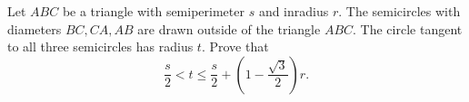 Let $ABC$ be a triangle with semiperimeter $s$ and inradius $r$. The semicircles with diameters $BC, CA, AB$ are drawn outside of the triangle $ABC$. The circle tangent to all three semicircles has radius $t$. Prove that
\[
\frac{s}{2} < t \leq \frac{s}{2} + \left(1 - \frac{\sqrt{3}}{2}\right) r.
\]
